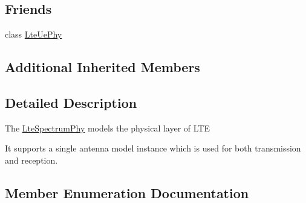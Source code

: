\subsection*{Friends}
\begin{DoxyCompactItemize}
\item 
class \hyperlink{classns3_1_1LteSpectrumPhy_ade394095214fcca968b16b72c57090b0}{Lte\+Ue\+Phy}
\end{DoxyCompactItemize}
\subsection*{Additional Inherited Members}


\subsection{Detailed Description}
The \hyperlink{classns3_1_1LteSpectrumPhy}{Lte\+Spectrum\+Phy} models the physical layer of L\+TE

It supports a single antenna model instance which is used for both transmission and reception. 

\subsection{Member Enumeration Documentation}
